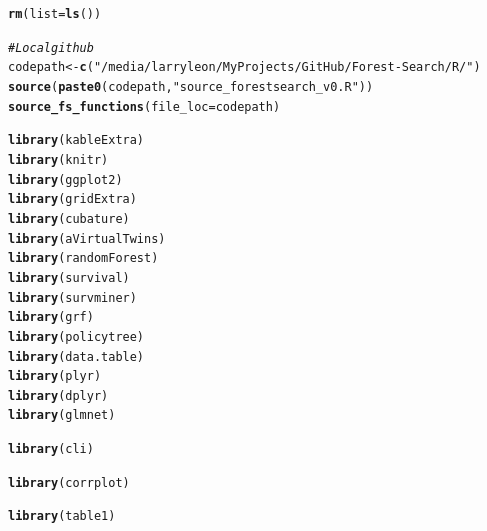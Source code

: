 \documentclass[12pt]{article}
\makeatletter
\newcommand{\hlstr}[1]{\textcolor[rgb]{0.192,0.494,0.8}{#1}}%
\newcommand{\hlcom}[1]{\textcolor[rgb]{0.678,0.584,0.686}{\textit{#1}}}%
\newcommand{\hlstd}[1]{\textcolor[rgb]{0.345,0.345,0.345}{#1}}%
\newcommand{\hlkwb}[1]{\textcolor[rgb]{0.69,0.353,0.396}{#1}}%
\newcommand{\hlkwc}[1]{\textcolor[rgb]{0.333,0.667,0.333}{#1}}%
\newcommand{\hlkwd}[1]{\textcolor[rgb]{0.737,0.353,0.396}{\textbf{#1}}}%
\newenvironment{kframe}{%
 \def\at@end@of@kframe{}%
 \ifinner\ifhmode%
  \def\at@end@of@kframe{\end{minipage}}%
  \begin{minipage}{\columnwidth}%
 \fi\fi%
 \def\FrameCommand##1{\hskip\@totalleftmargin \hskip-\fboxsep
 \colorbox{shadecolor}{##1}\hskip-\fboxsep
     \hskip-\linewidth \hskip-\@totalleftmargin \hskip\columnwidth}%
 \MakeFramed {\advance\hsize-\width
   \@totalleftmargin\z@ \linewidth\hsize
   \@setminipage}}%
 {\par\unskip\endMakeFramed%
 \at@end@of@kframe}
\newenvironment{knitrout}{}{} %
\makeatother
\begin{document}
\begin{knitrout}
\color{fgcolor}\begin{kframe}
\begin{alltt}
\hlkwd{rm}\hlstd{(}\hlkwc{list} \hlstd{=} \hlkwd{ls}\hlstd{())}

\hlcom{# Local github}
\hlstd{codepath} \hlkwb{<-} \hlkwd{c}\hlstd{(}\hlstr{"/media/larryleon/My Projects/GitHub/Forest-Search/R/"}\hlstd{)}
\hlkwd{source}\hlstd{(}\hlkwd{paste0}\hlstd{(codepath,} \hlstr{"source_forestsearch_v0.R"}\hlstd{))}
\hlkwd{source_fs_functions}\hlstd{(}\hlkwc{file_loc} \hlstd{= codepath)}

\hlkwd{library}\hlstd{(kableExtra)}
\hlkwd{library}\hlstd{(knitr)}
\hlkwd{library}\hlstd{(ggplot2)}
\hlkwd{library}\hlstd{(gridExtra)}
\hlkwd{library}\hlstd{(cubature)}
\hlkwd{library}\hlstd{(aVirtualTwins)}
\hlkwd{library}\hlstd{(randomForest)}
\hlkwd{library}\hlstd{(survival)}
\hlkwd{library}\hlstd{(survminer)}
\hlkwd{library}\hlstd{(grf)}
\hlkwd{library}\hlstd{(policytree)}
\hlkwd{library}\hlstd{(data.table)}
\hlkwd{library}\hlstd{(plyr)}
\hlkwd{library}\hlstd{(dplyr)}
\hlkwd{library}\hlstd{(glmnet)}

\hlkwd{library}\hlstd{(cli)}

\hlkwd{library}\hlstd{(corrplot)}

\hlkwd{library}\hlstd{(table1)}
\end{alltt}
\end{kframe}
\end{knitrout}
\end{document}
